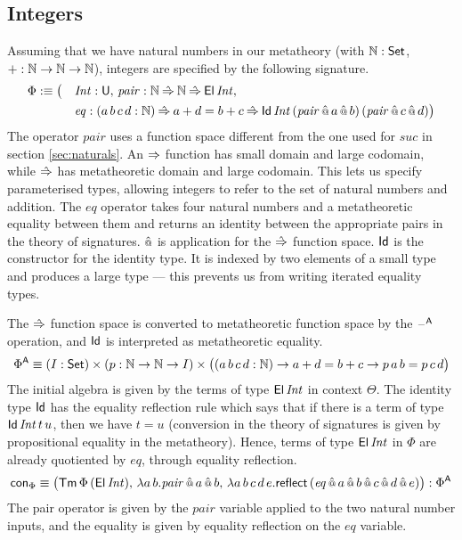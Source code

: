 \documentclass[acmsmall,review]{acmart}\settopmatter{printfolios=true,printccs=false,printacmref=false}
\begin{document}
\subsection{Integers}
\label{sec:integers}

Assuming that we have natural numbers in our metatheory (with $\mathbb{N} : \mathsf{Set}$,
$+ : \mathbb{N}\rightarrow\mathbb{N}\rightarrow\mathbb{N}$), integers are specified by the following signature.
\begin{alignat*}{5}
  & \Phi :\equiv \big( && \mathit{Int} : \mathsf{U},\, \mathit{pair} : \mathbb{N}\mathbin{\hat{\Rightarrow}}\mathbb{N}\mathbin{\hat{\Rightarrow}}\mathsf{El}\,\mathit{Int}, \\
  & && \mathit{eq}:(a\,b\,c\,d:\mathbb{N})\mathbin{\hat{\Rightarrow}} a+d=b+c \mathbin{\hat{\Rightarrow}}\mathsf{Id}\,\mathit{Int}\,(\mathit{pair}\mathop{\hat{\mathop{{\scriptstyle @}}}} a\mathop{\hat{\mathop{{\scriptstyle @}}}} b)\,(\mathit{pair}\mathop{\hat{\mathop{{\scriptstyle @}}}} c\mathop{\hat{\mathop{{\scriptstyle @}}}} d)\big)
\end{alignat*}
The operator $\mathit{pair}$ uses a function space different from the
one used for $\mathit{suc}$ in section \ref{sec:naturals}. An $\Rightarrow$
function has small domain and large codomain, while $\mathbin{\hat{\Rightarrow}}$ has
metatheoretic domain and large codomain. This lets us specify
parameterised types, allowing integers to refer to the set of natural
numbers and addition. The $\mathit{eq}$ operator takes four natural
numbers and a metatheoretic equality between them and returns an
identity between the appropriate pairs in the theory of
signatures. $\mathop{\hat{\mathop{{\scriptstyle @}}}}$ is application for the $\mathbin{\hat{\Rightarrow}}$ function
space. $\mathsf{Id}$ is the constructor for the identity type. It is indexed
by two elements of a small type and produces a large type --- this
prevents us from writing iterated equality types.

The $\mathbin{\hat{\Rightarrow}}$ function space is converted to metatheoretic function space
by the $\mathord{\hspace{1pt}\text{--}\hspace{1pt}}^{\mathsf{A}}$ operation, and $\mathsf{Id}$ is interpreted as metatheoretic
equality.
\[
\Phi^{\mathsf{A}} \equiv (I:\mathsf{Set})\times(p:\mathbb{N}\rightarrow\mathbb{N}\rightarrow I)\times\big((a\,b\,c\,d:\mathbb{N})\rightarrow a+d=b+c\rightarrow p\,a\,b=p\,c\,d\big)
\]
The initial algebra is given by the terms of type $\mathsf{El}\,\mathit{Int}$
in context $\Theta$. The identity type $\mathsf{Id}$ has the equality reflection
rule which says that if there is a term of type
$\mathsf{Id}\,\mathit{Int}\,t\,u$, then we have $t = u$ (conversion in the
theory of signatures is given by propositional equality in the
metatheory). Hence, terms of type $\mathsf{El}\,\mathit{Int}$ in $\Phi$ are
already quotiented by $\mathit{eq}$, through equality reflection.
\[
\mathsf{con}_\Phi \equiv \big(\mathsf{Tm}\,\Phi\,(\mathsf{El}\,\mathit{Int}),\, \lambda a\,b.\mathit{pair}\mathop{\hat{\mathop{{\scriptstyle @}}}} a\mathop{\hat{\mathop{{\scriptstyle @}}}} b,\, \lambda a\,b\,c\,d\,e.\mathsf{reflect}\,(\mathit{eq}\mathop{\hat{\mathop{{\scriptstyle @}}}} a\mathop{\hat{\mathop{{\scriptstyle @}}}} b\mathop{\hat{\mathop{{\scriptstyle @}}}} c\mathop{\hat{\mathop{{\scriptstyle @}}}} d\mathop{\hat{\mathop{{\scriptstyle @}}}} e)\big) : \Phi^{\mathsf{A}}
\]
The pair operator is given by the $\mathit{pair}$ variable applied
to the two natural number inputs, and the equality is given by
equality reflection on the $\mathit{eq}$ variable.
\end{document}
